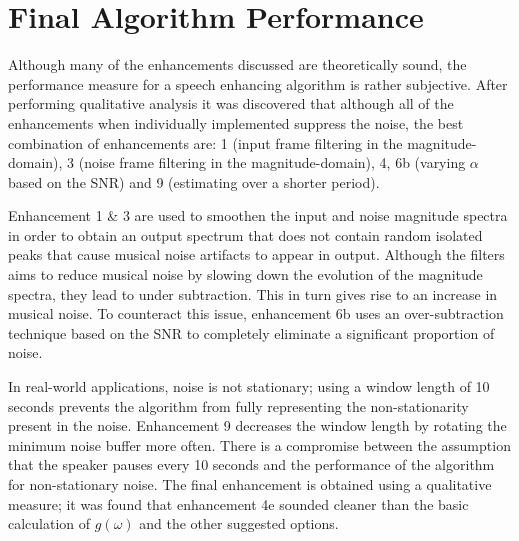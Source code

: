 \documentclass[a4paper,pra,twocolumn,10pt,aps,longbibliography,nobalancelastpage]{revtex4-1}
\begin{document}
\section{Final Algorithm Performance}

Although many of the enhancements discussed are theoretically sound, the performance measure for a speech enhancing algorithm is rather subjective. After performing qualitative analysis it was discovered that although all of the enhancements when individually implemented suppress the noise, the best combination of enhancements are: 1 (input frame filtering in the magnitude-domain), 3 (noise frame filtering in the magnitude-domain), 4, 6b (varying $\alpha$ based on the SNR) and 9 (estimating over a shorter period).

Enhancement 1 \& 3 are used to smoothen the input and noise magnitude spectra in order to obtain an output spectrum that does not contain random isolated peaks that cause musical noise artifacts to appear in output. Although the filters aims to reduce musical noise by slowing down the evolution of the magnitude spectra, they lead to under subtraction. This in turn gives rise to an increase in musical noise. To counteract this issue, enhancement 6b uses an over-subtraction technique based on the SNR to completely eliminate a significant proportion of noise. 

In real-world applications, noise is not stationary; using a window length of 10 seconds prevents the algorithm from fully representing the non-stationarity present in the noise. Enhancement 9 decreases the window length by rotating the minimum noise buffer more often. There is a compromise between the assumption that the speaker pauses every 10 seconds and the performance of the algorithm for non-stationary noise. The final enhancement is obtained using a qualitative measure; it was found that enhancement 4e sounded cleaner than the basic calculation of $g(\omega)$ and the other suggested options.
\end{document}
